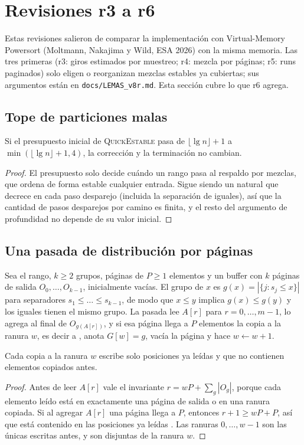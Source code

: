 \section{Revisiones r3 a r6}\label{sec:v8r6}
Estas revisiones salieron de comparar la implementación con Virtual-Memory Powersort
(Moltmann, Nakajima y Wild, ESA 2026) con la misma memoria. Las tres primeras (r3: giros
estimados por muestreo; r4: mezcla por páginas; r5: runs paginados) solo eligen o reorganizan
mezclas estables ya cubiertas; sus argumentos están en \texttt{docs/LEMAS\_v8r.md}. Esta
sección cubre lo que r6 agrega.

\subsection{Tope de particiones malas}
\begin{observacion}\label{obs:tope}
Si el presupuesto inicial de \textsc{QuickEstable} pasa de $\lfloor\lg n\rfloor+1$ a
$\min(\lfloor\lg n\rfloor+1,4)$, la corrección y la terminación no cambian.
\end{observacion}
\begin{proof}
El presupuesto solo decide cuándo un rango pasa al respaldo por mezclas, que ordena de forma
estable cualquier entrada. Sigue siendo un natural que decrece en cada paso desparejo
(incluida la separación de iguales), así que la cantidad de pasos desparejos por camino es
finita, y el resto del argumento de profundidad no depende de su valor inicial.
\end{proof}

\subsection{Una pasada de distribución por páginas}
Sea  el rango, $k\ge2$ grupos, páginas de $P\ge1$ elementos y un buffer con $k$
páginas de salida $O_0,\dots,O_{k-1}$, inicialmente vacías. El grupo de $x$ es
$g(x)=|\{j: s_j\le x\}|$ para separadores $s_1\le\dots\le s_{k-1}$, de modo que $x\le y$
implica $g(x)\le g(y)$ y los iguales tienen el mismo grupo. La pasada lee $A[r]$ para
$r=0,\dots,m-1$, lo agrega al final de $O_{g(A[r])}$, y si esa página llega a $P$ elementos
la copia a la ranura $w$, es decir a , anota $G[w]=g$, vacía la página y
hace $w\gets w+1$.

\begin{lema}\label{lem:ranura}
Cada copia a la ranura $w$ escribe solo posiciones ya leídas y que no contienen elementos
copiados antes.
\end{lema}
\begin{proof}
Antes de leer $A[r]$ vale el invariante $r=wP+\sum_g|O_g|$, porque cada elemento leído está en
exactamente una página de salida o en una ranura copiada. Si al agregar $A[r]$ una página llega
a $P$, entonces $r+1\ge wP+P$, así que  está contenido en las posiciones ya
leídas . Las ranuras $0,\dots,w-1$ son las únicas escritas antes, y son
disjuntas de la ranura $w$.
\end{proof}

